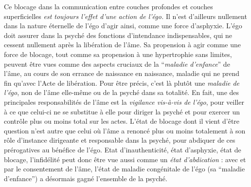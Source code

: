 Ce blocage dans la communication entre couches profondes et couches superficielles \textit{est toujours l'effet d'une action de l'égo.} Il n'est d'ailleurs nullement dans la nature éternelle de l'égo d'agir ainsi, comme une force d'asphyxie. L'égo doit assurer dans la psyché des fonctions d'intendance indispensables, qui ne cessent nullement après la libération de l'âme. Sa propension à agir comme une force de blocage, tout comme sa propension à une hypertrophie sans limites, peuvent être vues comme des aspects cruciaux de la ``\textit{maladie d'enfance}'' de l'âme, au cours de son errance de naissance en naissance, maladie qui ne prend fin qu'avec l'Acte de libération. Pour être précis, c'est là plutôt une \textit{maladie de l'égo}, non de l'âme elle-même ou de la psyché dans sa totalité. En fait, une des principales responsabilités de l'âme est la \textit{vigilance vis-à-vis de l'égo}, pour veiller à ce que celui-ci ne se substitue à elle pour diriger la psyché et pour exercer un contrôle plus ou moins total sur les actes. L'état de blocage dont il vient d'être question n'est autre que celui où l'âme a renoncé plus ou moins totalement à son rôle d'instance dirigeante et responsable dans la psyché, pour abdiquer de ces prérogatives au bénéfice de l'égo. Etat d'inauthenticité, état d'asphyxie, état de blocage, l'infidélité peut donc être vue aussi comme un \textit{état d'abdication} : avec et par le consentement de l'âme, l'état de maladie congénitale de l'égo (sa ``maladie d'enfance'') a désormais gagné l'ensemble de la psyché.

